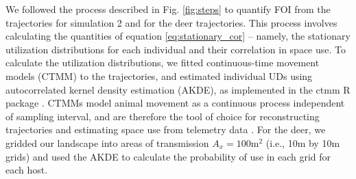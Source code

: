 \documentclass[letterpaper]{article}
\begin{document}
We followed the process described in Fig. \ref{fig:steps} to quantify FOI from the trajectories for simulation 2 and for the deer trajectories. This process involves calculating the quantities of equation \ref{eq:stationary_cor} -- namely, the stationary utilization distributions for each individual and their correlation in space use.  To calculate the utilization distributions, we fitted continuous-time movement models (CTMM) to the trajectories, and estimated individual UDs using autocorrelated kernel density estimation (AKDE), as implemented in the ctmm R package \citep{Fleming2014, Calabrese2016,Fleming2022}. CTMMs model animal movement as a continuous process independent of sampling interval, and are therefore the tool of choice for reconstructing trajectories and estimating space use from telemetry data \citep{Fleming2014}. For the deer, we gridded our landscape into areas of transmission $A_x = 100 \text{m}^2$ (i.e., 10m by 10m grids) and used the AKDE to calculate the probability of use in each grid for each host.    %
\end{document}
